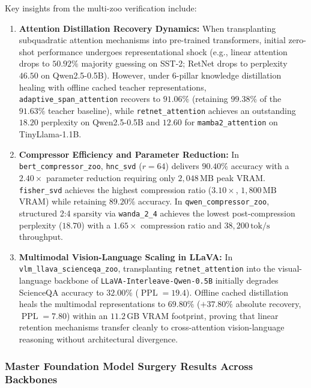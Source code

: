 Key insights from the multi-zoo verification include:
\begin{enumerate}
    \item \textbf{Attention Distillation Recovery Dynamics:} When transplanting subquadratic attention mechanisms into pre-trained transformers, initial zero-shot performance undergoes representational shock (e.g., linear attention drops to $50.92\%$ majority guessing on SST-2; RetNet drops to perplexity $46.50$ on Qwen2.5-0.5B). However, under 6-pillar knowledge distillation healing with offline cached teacher representations, \texttt{adaptive\_span\_attention} recovers to $91.06\%$ (retaining $99.38\%$ of the $91.63\%$ teacher baseline), while \texttt{retnet\_attention} achieves an outstanding $18.20$ perplexity on Qwen2.5-0.5B and $12.60$ for \texttt{mamba2\_attention} on TinyLlama-1.1B.
    \item \textbf{Compressor Efficiency and Parameter Reduction:} In \texttt{bert\_compressor\_zoo}, \texttt{hnc\_svd} ($r=64$) delivers $90.40\%$ accuracy with a $2.40\times$ parameter reduction requiring only $2{,}048\,\text{MB}$ peak VRAM. \texttt{fisher\_svd} achieves the highest compression ratio ($3.10\times$, $1{,}800\,\text{MB}$ VRAM) while retaining $89.20\%$ accuracy. In \texttt{qwen\_compressor\_zoo}, structured 2:4 sparsity via \texttt{wanda\_2\_4} achieves the lowest post-compression perplexity ($18.70$) with a $1.65\times$ compression ratio and $38{,}200\,\text{tok/s}$ throughput.
    \item \textbf{Multimodal Vision-Language Scaling in LLaVA:} In \texttt{vlm\_llava\_scienceqa\_zoo}, transplanting \texttt{retnet\_attention} into the visual-language backbone of \texttt{LLaVA-Interleave-Qwen-0.5B} initially degrades ScienceQA accuracy to $32.00\%$ ($\operatorname{PPL} = 19.4$). Offline cached distillation heals the multimodal representations to $69.80\%$ ($+37.80\%$ absolute recovery, $\operatorname{PPL} = 7.80$) within an $11.2\,\text{GB}$ VRAM footprint, proving that linear retention mechanisms transfer cleanly to cross-attention vision-language reasoning without architectural divergence.
\end{enumerate}

\subsubsection{Master Foundation Model Surgery Results Across Backbones}
\label{sec:results_master_surgery_table}

